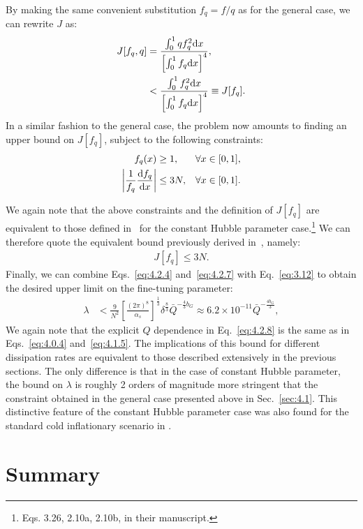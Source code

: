 \documentclass[aps,prd,twocolumn,amssymb,amsmath,floatfix,nofootinbib,superscriptaddress,preprintnumbers]{revtex4-1}
\begin{document}
By making the same convenient substitution $f_q=f/q$ as for the general case, we can rewrite $J$ as:
\begin{align}
    J[f_q,q] &= \frac{\int_{0}^{1} qf_q^{2} {\rm d} x}{\left[\int_{0}^{1} f_q  {\rm d} x\right]^{4}}, \nonumber\\ &< \frac{\int_{0}^{1} f_q^{2} {\rm d} x}{\left[\int_{0}^{1} f_q  {\rm d} x\right]^{4}} \equiv J[f_q]. \label{eq:4.2.4}
\end{align}
In a similar fashion to the general case, the problem now amounts to finding an upper bound  on $J[f_q]$, subject to the following constraints:
\begin{align}
    f_q(x)&\geq 1, & \forall x \in[0,1], \label{eq:4.2.5}\\
\left|\frac{1}{f_q} \frac{{\rm d} f_q}{{\rm d} x}\right| &\leq 3 N, & \forall x \in[0,1]. \label{eq:4.2.6}
\end{align}

We again note that the above constraints and the definition of $J[f_q]$ are equivalent to those defined in~\cite{Adams:1990pn} for the constant Hubble parameter case.\footnote{Eqs. 3.26, 2.10a, 2.10b, in their manuscript.} We can therefore quote the equivalent bound previously derived in~\cite{Adams:1990pn}, namely:
\begin{align}
 J[f_q]\leq 3N. \label{eq:4.2.7}
\end{align}
Finally, we can combine Eqs.~\ref{eq:4.2.4} and~\ref{eq:4.2.7} with Eq.~\ref{eq:3.12} to obtain the desired upper limit on the fine-tuning parameter:
\begin{align}
    \lambda &< \frac{9}{N^2}\left[\frac{(2\pi)^8}{\alpha_s}\right]^{\frac{1}{3}}\delta^{\frac{8}{3}} \bar{Q}^{-\frac{4}{3}b_G}\approx 6.2\times 10^{-11} \bar{Q}^{-\frac{4b_G}{3}}, \label{eq:4.2.8}
\end{align}
We again note that the explicit $Q$ dependence in Eq.~\ref{eq:4.2.8} is the same as in Eqs.~\ref{eq:4.0.4} and~\ref{eq:4.1.5}. The implications of this bound for different dissipation rates are equivalent to those described extensively in the previous sections. The only difference is that in the case of constant Hubble parameter, the bound on $\lambda$ is roughly 2 orders of magnitude more stringent that the constraint obtained in the general case presented above in Sec.~\ref{sec:4.1}. This distinctive feature of the constant Hubble parameter case was also found for the standard cold inflationary scenario in \cite{Adams:1990pn}.

\section{Summary} \label{sec:5}
\end{document}

